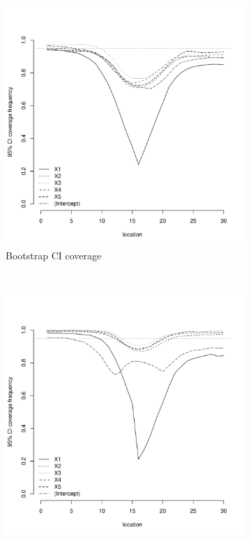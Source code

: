 \documentclass[authoryear, review, 11pt]{elsarticle}
\begin{document}
\begin{figure}
	\vspace{-30mm}
	\centering
	\begin{subfigure}[b]{0.45\textwidth}
	\centering
		\includegraphics[width=\textwidth]{../../figures/simulation/15.19.profile_bootstrap_coverage.pdf}
		\caption{Bootstrap CI coverage}
	\end{subfigure}%
	~ %
	\begin{subfigure}[b]{0.45\textwidth}
	\centering
		\includegraphics[width=\textwidth]{../../figures/simulation/15.19.profile_se_coverage.pdf}

\end{subfigure}
\end{figure}
\end{document}
